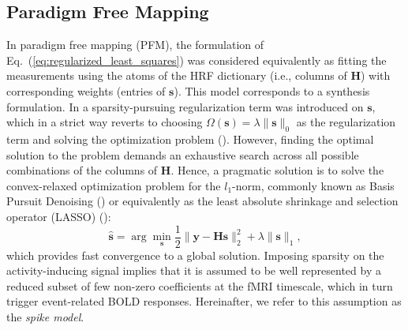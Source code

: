 \subsection{Paradigm Free Mapping}
 In paradigm free mapping (PFM), the formulation of Eq.~(\ref{eq:regularized_least_squares}) was considered equivalently as fitting the measurements using the atoms of the HRF dictionary (i.e., columns of $\mathbf{H}$) with corresponding weights (entries of $\mathbf{s}$). This model corresponds to a synthesis formulation. In \citealt{Gaudes2013Paradigmfreemapping} a sparsity-pursuing regularization term was introduced on $\mathbf{s}$, which in a strict way reverts to choosing \(\Omega(\mathbf{s})=\lambda \| \mathbf{s} \|_0\) as the regularization term and solving the optimization problem (\citealt{Bruckstein2009SparseSolutionsSystems}). However, finding the optimal solution to the problem demands an exhaustive search across all possible combinations of the columns of \(\mathbf{H}\). Hence, a  pragmatic solution is to solve the convex-relaxed optimization problem for the \(l_1\)-norm, commonly known as Basis Pursuit Denoising (\citealt{Chen2001BasisPursuitDenoising}) or equivalently as the least absolute shrinkage and selection operator (LASSO) (\citealt{Tibshirani1996RegressionShrinkageSelection}): 
\begin{equation}
    \label{eq:pfm_spike}
    \hat{\mathbf{s}} = \arg \min_{\mathbf{s}} \frac{1}{2} \| \mathbf{y} - \mathbf{Hs} \|_2^2 + \lambda \| \mathbf{s} \|_1,
\end{equation}
which provides fast convergence to a global solution. Imposing sparsity on the activity-inducing signal implies that it is assumed to be well represented by a reduced subset of few non-zero coefficients at the fMRI timescale, which in turn trigger event-related BOLD responses. Hereinafter, we refer to this assumption as the \textit{spike model}. 


